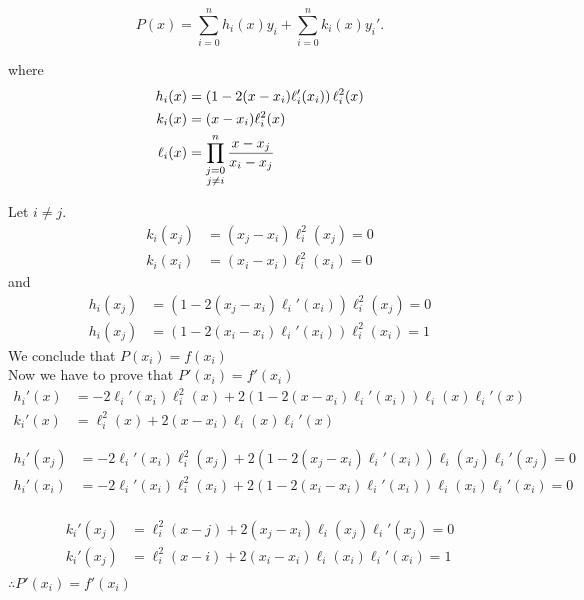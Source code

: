 \documentclass{report}
\begin{document}
\begin{myproof}

	\[
		P(x) = \sum_{i=0}^n h_i(x)y_i + \sum_{i=0}^{n}k_i(x)y_i'
		.\]

	where
	\begin{align*}
		h_i(x)    & =\left(1-2(x-x_i)\ell_i'(x_i)\right)\ell^2_i(x) \\
		k_i(x)    & =(x-x_i)\ell^2_i(x)                        \\
		\ell_i(x) & = \prod_{\substack{j=0                     \\j\neq i}}^n \frac{x-x_j}{x_i-x_j}
	\end{align*}

	Let $i\neq j$.
	\begin{align*}
		k_i(x_j) & = (x_j-x_i)\ell_i^2(x_j)=0 \\
		k_i(x_i) & = (x_i-x_i)\ell_i^2(x_i)=0
	\end{align*}
	and
	\begin{align*}
		h_i(x_j) & = (1-2(x_j-x_i)\ell_i'(x_i))\ell_i^2(x_j)=0 \\
		h_i(x_j) & = (1-2(x_i-x_i)\ell_i'(x_i))\ell_i^2(x_i)=1
	\end{align*}
	We conclude that $P(x_i) = f(x_i)$\\

	Now we have to prove that $P'(x_i) = f'(x_i)$
	\begin{align*}
		h_i'(x) & = -2\ell_i'(x_i)\ell_i^2(x)+2(1-2(x-x_i)\ell_i'(x_i))\ell_i(x)\ell_i'(x) \\
		k_i'(x) & = \ell^2_i(x) + 2(x-x_i)\ell_i(x)\ell_i'(x)
	\end{align*}

	\begin{align*}
		h_i'(x_j) & = -2\ell_i'(x_i)\ell_i^2(x_j)+2(1-2(x_j-x_i)\ell_i'(x_i))\ell_i(x_j)\ell_i'(x_j) = 0 \\
		h_i'(x_i) & = -2\ell_i'(x_i)\ell_i^2(x_i)+2(1-2(x_i-x_i)\ell_i'(x_i))\ell_i(x_i)\ell_i'(x_i) =0  \\
	\end{align*}

	\begin{align*}
		k_i'(x_j) & = \ell^2_i(x-j) + 2(x_j-x_i)\ell_i(x_j)\ell_i'(x_j) = 0 \\
		k_i'(x_j) & = \ell^2_i(x-i) + 2(x_i-x_i)\ell_i(x_i)\ell_i'(x_i) = 1 \\
	\end{align*}
	$\therefore P'(x_i) = f'(x_i)$
\end{myproof}
\end{document}
